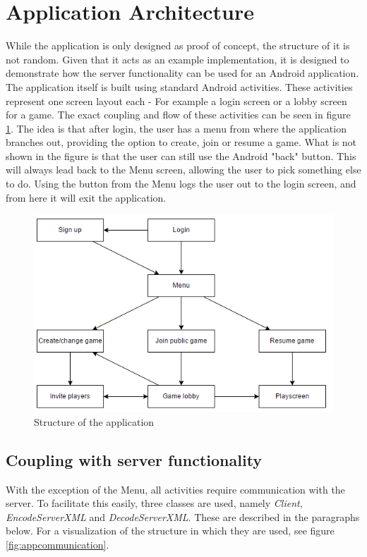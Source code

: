 \section{Application Architecture}
\label{sec:application_architecture}
While the application is only designed as proof of concept, the structure of it is not random. Given that it acts as an example implementation, it is designed to demonstrate how the server functionality can be used for an Android application. The application itself is built using standard Android activities. These activities represent one screen layout each - For example a login screen or a lobby screen for a game. The exact coupling and flow of these activities can be seen in figure \ref{fig:appstructure}. The idea is that after login, the user has a menu from where the application branches out, providing the option to create, join or resume a game. What is not shown in the figure is that the user can still use the Android "back" button. This will always lead back to the Menu screen, allowing the user to pick something else to do. Using the button from the Menu logs the user out to the login screen, and from here it will exit the application.

\begin{figure}[H]
\centering
\includegraphics[width=\textwidth]{billeder/appstructure.png}
\caption{Structure of the application}
\label{fig:appstructure}
\end{figure}

\subsection{Coupling with server functionality}
With the exception of the Menu, all activities require communication with the server. To facilitate this easily, three classes are used, namely \textit{Client}, \textit{EncodeServerXML} and \textit{DecodeServerXML}. These are described in the paragraphs below. For a visualization of the structure in which they are used, see figure \ref{fig:appcommunication}.

